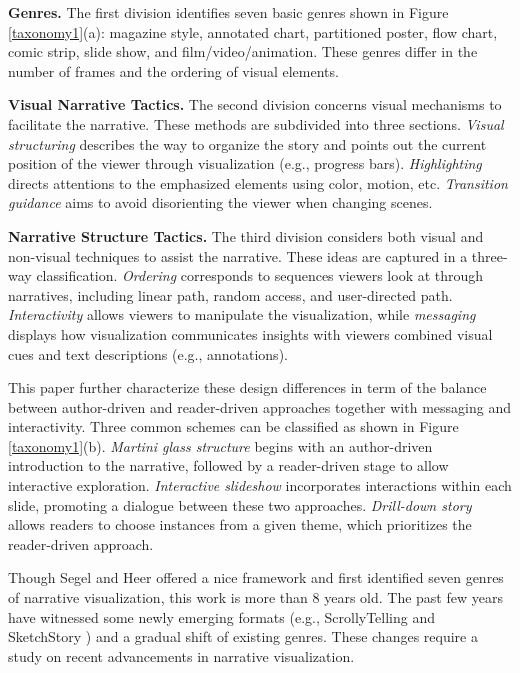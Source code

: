 \begin{compactitem}
	\item \textbf{Genres.} The first division identifies seven basic genres shown in Figure \ref{taxonomy1}(a): magazine style, annotated chart, partitioned poster, flow chart, comic strip, slide show, and film/video/animation.   These genres differ in the number of frames and the ordering of visual elements. 
	
	\item \textbf{Visual Narrative Tactics.} The second division concerns visual mechanisms to facilitate the narrative. These methods are subdivided into three sections. \textit{Visual structuring} describes the way to organize the story and points out the current position of the viewer through visualization (e.g., progress bars). \textit{Highlighting} directs attentions to the emphasized elements using color, motion, etc. \textit{Transition guidance} aims to avoid disorienting the viewer when changing scenes.
	
	\item \textbf{Narrative Structure Tactics.} The third division considers both visual and non-visual techniques to assist the narrative. These ideas are captured in a three-way classification. \textit{Ordering} corresponds to sequences viewers look at through narratives, including linear path, random access, and user-directed path. \textit{Interactivity} allows viewers to manipulate the visualization, while \textit{messaging} displays how visualization communicates insights with viewers combined visual cues and text descriptions (e.g., annotations). 
	
\end{compactitem}

This paper further characterize these design differences in term of the balance between author-driven and reader-driven approaches together with messaging and interactivity. Three common schemes can be classified as shown in Figure \ref{taxonomy1}(b). \textit{Martini glass structure} begins with an author-driven introduction to the narrative, followed by a reader-driven stage to allow interactive exploration. \textit{Interactive slideshow} incorporates interactions within each slide, promoting a dialogue between these two approaches. \textit{Drill-down story} allows readers to choose instances from a given theme, which prioritizes the reader-driven approach.

Though Segel and Heer offered a nice framework and first identified seven genres of narrative visualization, this work is more than 8 years old. The past few years have witnessed some newly emerging formats (e.g., ScrollyTelling \cite{scrollytelling} and SketchStory \cite{Lee2013}) and a gradual shift of existing genres. These changes require a study on recent advancements in narrative visualization. 

